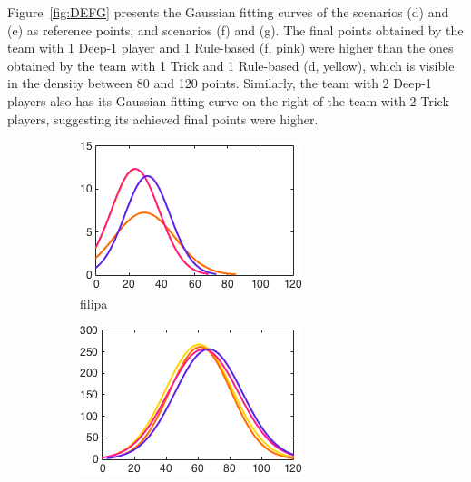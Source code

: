 Figure~\ref{fig:DEFG} presents the Gaussian fitting curves of the scenarios (d) and (e) as reference points, and scenarios (f) and (g).
The final points obtained by the team with 1 Deep-1 player and 1 Rule-based (f, pink) were higher than the ones obtained by the team with 1 Trick and 1 Rule-based (d, yellow), which is visible in the density between 80 and 120 points.
Similarly, the team with 2 Deep-1 players also has its Gaussian fitting curve on the right of the team with 2 Trick players, suggesting its achieved final points were higher.

\begin{figure}[h]
        \centering
        \begin{subfigure}[h]{0.32\textwidth}
                \includegraphics[width=\textwidth]{./img/4/DEFGhard}
                \caption{filipa}
                \label{fig:DEFGhard}
        \end{subfigure}
        \begin{subfigure}[h]{0.32\textwidth}
                \includegraphics[width=\textwidth]{./img/4/DEFGmedium}

\end{subfigure}
\end{figure}

